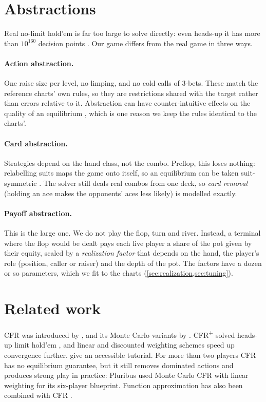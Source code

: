 \section{Abstractions}\label{sec:intro-abstractions}

Real no-limit hold'em is far too large to solve directly: even heads-up it has more than $10^{160}$ decision points \cite{johanson2013}. Our game differs from the real game in three ways.

\paragraph{Action abstraction.} One raise size per level, no limping, and no cold calls of 3-bets. These match the reference charts' own rules, so they are restrictions shared with the target rather than errors relative to it. Abstraction can have counter-intuitive effects on the quality of an equilibrium \cite{waugh2009}, which is one reason we keep the rules identical to the charts'.

\paragraph{Card abstraction.} Strategies depend on the hand class, not the combo. Preflop, this loses nothing: relabelling suits maps the game onto itself, so an equilibrium can be taken suit-symmetric \cite{gilpin2007}. The solver still deals real combos from one deck, so \emph{card removal} (holding an ace makes the opponents' aces less likely) is modelled exactly.

\paragraph{Payoff abstraction.} This is the large one. We do not play the flop, turn and river. Instead, a terminal where the flop would be dealt pays each live player a share of the pot given by their equity, scaled by a \emph{realization factor} that depends on the hand, the player's role (position, caller or raiser) and the depth of the pot. The factors have a dozen or so parameters, which we fit to the charts (\cref{sec:realization,sec:tuning}).

\section{Related work}\label{sec:intro-related}

CFR was introduced by \textcite{zinkevich2007}, and its Monte Carlo variants by \textcite{lanctot2009}. CFR\textsuperscript{+} \cite{tammelin2014} solved heads-up limit hold'em \cite{bowling2015}, and linear and discounted weighting schemes \cite{brown2019discounted} speed up convergence further. \textcite{neller2013} give an accessible tutorial. For more than two players CFR has no equilibrium guarantee, but it still removes dominated actions \cite{gibson2014} and produces strong play in practice: Pluribus \cite{brown2019pluribus} used Monte Carlo CFR with linear weighting for its six-player blueprint. Function approximation has also been combined with CFR \cite{brown2019deep, moravcik2017}.

